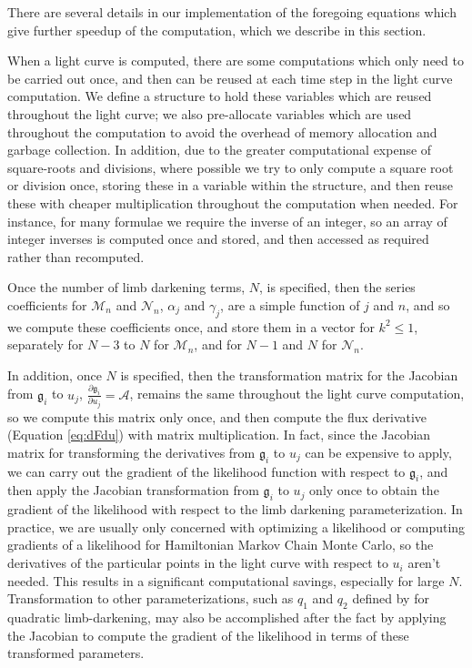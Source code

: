 \documentclass[modern,trackchanges]{aastex63}
\begin{document}
There are several details in our implementation of the foregoing equations
which give further speedup of the computation, which we describe in this
section.

When a light curve is computed, there are some computations which only
need to be carried out once, and then can be reused at each time step in the
light curve computation.
We define a structure to hold these variables
which are reused throughout the light curve; we also pre-allocate variables which
are used throughout the computation to avoid the overhead of memory allocation
and garbage collection.  In addition, due to the greater
computational expense of square-roots and divisions, where possible we try
to only compute a square root or division once, storing these in a variable
within the structure, and then reuse these with cheaper multiplication
throughout the computation when needed.  For instance, for many formulae we
require the inverse of an integer, so an array of integer inverses is computed
once and stored, and then accessed as required rather than recomputed.

Once the number of limb darkening
terms, $N$, is specified, then the series coefficients for $\mathcal{M}_n$
and $\mathcal{N}_n$, $\alpha_j$ and $\gamma_j$, are a simple function of $j$
and $n$, and so we compute these coefficients once, and store them in a vector
for $k^2 \le 1$, separately for $N-3$ to $N$ for $\mathcal{M}_n$, and for
$N-1$ and $N$ for $\mathcal{N}_n$.

In addition, once $N$ is specified, then the transformation matrix for
the Jacobian from $\mathfrak{g}_i$ to $u_j$, $\frac{\partial \mathfrak{g}_i}{\partial u_j}=\mathcal{A}$,
remains the same throughout the light curve
computation, so we compute this matrix only once, and then compute the
flux derivative (Equation \ref{eq:dFdu}) with matrix multiplication.
In fact, since the Jacobian matrix for transforming the derivatives from $\mathfrak{g}_i$
to $u_j$ can be expensive to apply, we can carry out the gradient of the
likelihood function with respect to $\mathfrak{g}_i$, and then apply the Jacobian
transformation from $\mathfrak{g}_i$ to $u_j$ only once to obtain the gradient
of the likelihood with respect to the limb darkening parameterization.
In practice, we are usually only concerned with optimizing a likelihood
or computing gradients of a likelihood for Hamiltonian Markov Chain
Monte Carlo, so the derivatives of the particular points in the
light curve with respect to $u_i$ aren't needed.  This results in a
significant computational savings, especially for large $N$.
Transformation to other parameterizations, such as $q_1$ and $q_2$
defined by \citet{Kipping2013} for quadratic limb-darkening, may also be accomplished after the
fact by applying the Jacobian to compute the gradient of the likelihood
in terms of these transformed parameters.
\end{document}
